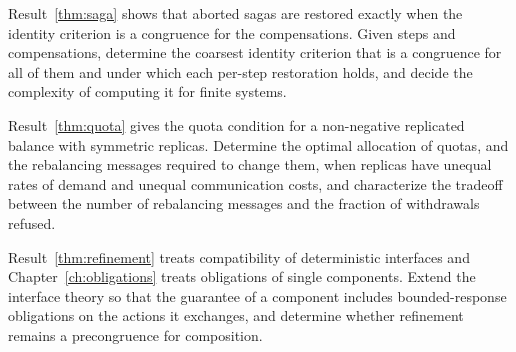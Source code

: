 \begin{researchproblem}
Result~\ref{thm:saga} shows that aborted sagas are restored exactly when the identity criterion is a congruence for the compensations. Given steps and compensations, determine the coarsest identity criterion that is a congruence for all of them and under which each per-step restoration holds, and decide the complexity of computing it for finite systems.
\end{researchproblem}

\begin{researchproblem}
Result~\ref{thm:quota} gives the quota condition for a non-negative replicated balance with symmetric replicas. Determine the optimal allocation of quotas, and the rebalancing messages required to change them, when replicas have unequal rates of demand and unequal communication costs, and characterize the tradeoff between the number of rebalancing messages and the fraction of withdrawals refused.
\end{researchproblem}

\begin{researchproblem}
Result~\ref{thm:refinement} treats compatibility of deterministic interfaces and Chapter~\ref{ch:obligations} treats obligations of single components. Extend the interface theory so that the guarantee of a component includes bounded-response obligations on the actions it exchanges, and determine whether refinement remains a precongruence for composition.
\end{researchproblem}
